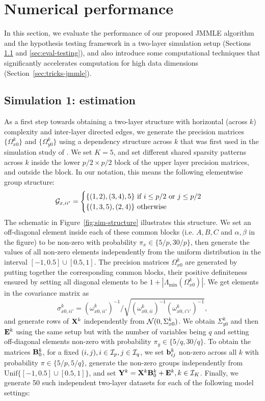 \section{Numerical performance}
\label{sec:sec4}
In this section, we evaluate the performance of our proposed JMMLE algorithm and the hypothesis testing framework in a two-layer simulation setup (Sections \ref{sec:eval-jmmle} and \ref{sec:eval-testing}), and also introduce some computational techniques that significantly accelerates computation for high data dimensions (Section~\ref{sec:tricks-jmmle}).

\subsection{Simulation 1: estimation}
\label{sec:eval-jmmle}
As a first step towards obtaining a two-layer structure with horizontal (across $k$) complexity and inter-layer directed edges, we generate the precision matrices $\{ \Omega_{x0}^k \}$ and $\{ \Omega_{y0}^k \}$ using a dependency structure across $k$ that was first used in the simulation study of \cite{MaMichailidis15}. We set $K=5$, and set different shared sparsity patterns across $k$ inside the lower $p/2 \times p/2$ block of the upper layer precision matrices, and outside the block. In our notation, this means the following elementwise group structure:
%
$$
{\cal{G}}_{x,ii'} = \begin{cases}
\{ (1,2),(3,4), 5 \} \text{ if } i \leq p/2 \text{ or } j \leq p/2\\
\{ (1,3,5),(2,4) \} \text{ otherwise }
\end{cases}
$$
%
The schematic in Figure~\ref{fig:sim-structure} illustrates this structure. We set an off-diagonal element inside each of these common blocks (i.e. $A,B,C$ and $\alpha, \beta$ in the figure) to be non-zero with probability $\pi_x \in \{ 5/p, 30/p \}$, then generate the values of all non-zero elements independently from the uniform distribution in the interval $[-1, 0.5] \cup [0.5, 1]$. The precision matrices $\Omega_{x0}^k$ are generated by putting together the corresponding common blocks, their positive definiteness ensured by setting all diagonal elements to be $1 + |\Lambda_{\min} (\Omega_{x0}^k)|$. We get elements in the covariance matrix as
%
$$
\sigma_{x0,ii'}^k = (\omega_{x0,ii'}^k)^{-1} / \sqrt{(\omega_{x0,ii}^k)^{-1} (\omega_{x0,i'i'}^k)^{-1} },
$$
and generate rows of ${\mathbf{X}}^k$ independently from ${\cal{N}}(0, \Sigma_{x0}^k)$. We obtain $\Sigma_{y0}^k$ and then ${\mathbf{E}}^k$ using the same setup but with the number of variables being $q$ and setting off-diagonal elements non-zero with probability $\pi_y \in \{ 5/q, 30/q \}$. To obtain the matrices ${\mathbf{B}}_0^k$, for a fixed $(i,j), i \in {\cal{I}}_p, j \in {\cal{I}}_q$, we set ${\bf{b}}_{ij}^k$ non-zero across all $k$ with probability $\pi \in \{ 5/p, 5/q \}$, generate the non-zero groups independently from $\text{Unif} \{ [-1, 0.5] \cup [0.5, 1] \}$, and set ${\mathbf{Y}}^k = {\mathbf{X}}^k {\mathbf{B}}_0^k + {\mathbf{E}}^k, k \in {\cal{I}}_K$. Finally, we generate 50 such independent two-layer datasets for each of the following model settings:

